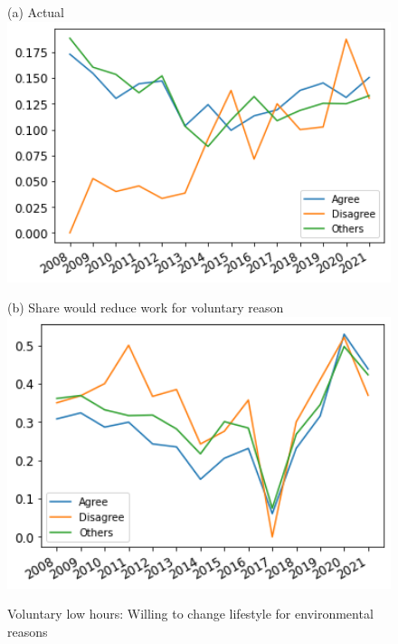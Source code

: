 \documentclass[12pt]{article}
\begin{document}
\begin{figure}[h!!]
	\centering	
	\caption{Voluntary low hours: Willing to change lifestyle for environmental reasons }\label{fig:evolution_wtr_willingtochange}	
	\begin{minipage}[h!!]{0.32\textwidth}  
		\centering\footnotesize{(a) Actual}
		\includegraphics[width=1\textwidth]{../codding_data/results/liss/broad_groups_work_redcuctionqk20a175_actual.png}
	\end{minipage}
	\begin{minipage}[h!!]{0.32\textwidth}
		\centering\footnotesize{(b) Share would reduce work for voluntary reason}
		\includegraphics[width=1\textwidth]{../codding_data/results/liss/broad_groups_work_redcuctionqk20a175_willing.png}
	\end{minipage}
\end{figure}
\end{document}
